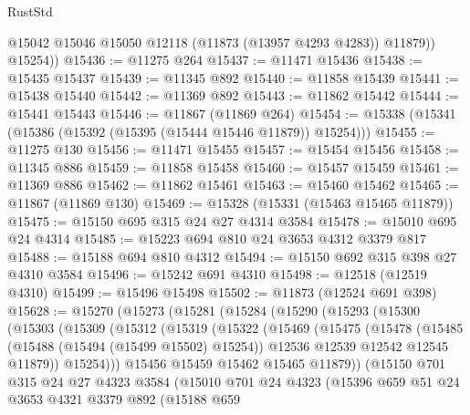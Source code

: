 \begin{lexlean}{RustStd}
\begin{coremodule}
            @15042
            @15046
            @15050
            @12118
            (@11873 (@13957 @4293 @4283))
            @11879))
        @15254))
@15436 := @11275 @264
@15437 := @11471 @15436
@15438 := @15435 @15437
@15439 := @11345 @892
@15440 := @11858 @15439
@15441 := @15438 @15440
@15442 := @11369 @892
@15443 := @11862 @15442
@15444 := @15441 @15443
@15446 := @11867 (@11869 @264)
@15454 := @15338 (@15341 (@15386 (@15392 (@15395 (@15444 @15446 @11879)) @15254)))
@15455 := @11275 @130
@15456 := @11471 @15455
@15457 := @15454 @15456
@15458 := @11345 @886
@15459 := @11858 @15458
@15460 := @15457 @15459
@15461 := @11369 @886
@15462 := @11862 @15461
@15463 := @15460 @15462
@15465 := @11867 (@11869 @130)
@15469 := @15328 (@15331 (@15463 @15465 @11879))
@15475 := @15150 @695 @315 @24 @27 @4314 @3584
@15478 := @15010 @695 @24 @4314
@15485 := @15223 @694 @810 @24 @3653 @4312 @3379 @817
@15488 := @15188 @694 @810 @4312
@15494 := @15150 @692 @315 @398 @27 @4310 @3584
@15496 := @15242 @691 @4310
@15498 := @12518 (@12519 @4310)
@15499 := @15496 @15498
@15502 := @11873 (@12524 @691 @398)
@15628 := @15270
    (@15273
      (@15281
        (@15284
          (@15290
            (@15293
              (@15300
                (@15303
                  (@15309
                    (@15312
                      (@15319
                        (@15322
                          (@15469
                            (@15475
                              (@15478
                                (@15485
                                  (@15488 (@15494 (@15499 @15502) @15254))
                                  @12536
                                  @12539
                                  @12542
                                  @12545
                                  @11879))
                              @15254)))
                        @15456
                        @15459
                        @15462
                        @15465
                        @11879))
                    (@15150
                      @701
                      @315
                      @24
                      @27
                      @4323
                      @3584
                      (@15010
                        @701
                        @24
                        @4323
                        (@15396
                          @659
                          @51
                          @24
                          @3653
                          @4321
                          @3379
                          @892
                          (@15188
                            @659

\end{coremodule}
\end{lexlean}
